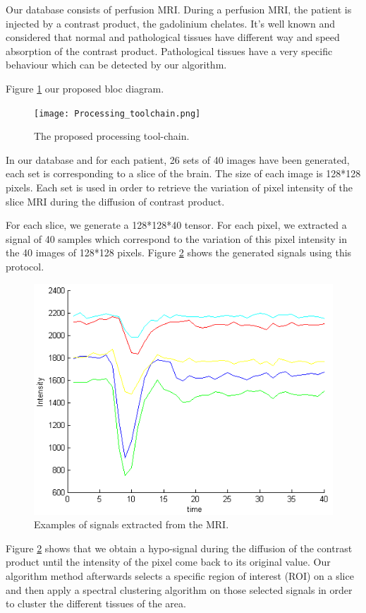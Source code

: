 Our database consists of perfusion MRI. During a perfusion MRI, the patient is injected by a contrast product, the gadolinium chelates. It's well known and considered that normal and pathological tissues have different way and speed absorption of the contrast product. Pathological tissues have a very specific behaviour which can be detected by our algorithm.

Figure \ref{fig:Processing_toolchain} our proposed bloc diagram.

\begin{figure}[h]
\centering
    \texttt{[image: Processing\_toolchain.png]}
    \caption{The proposed processing tool-chain.}
    \label{fig:Processing_toolchain}
\end{figure}



In our database and for each patient, 26 sets of 40 images have been generated, each set is corresponding to a slice of the brain. The size of each image is 128*128 pixels. Each set is used in order to retrieve the variation of pixel intensity of the slice MRI during the diffusion of contrast product.

For each slice, we generate a 128*128*40 tensor. For each pixel, we extracted a signal of 40 samples which correspond to the variation of this pixel intensity in the 40 images of 128*128 pixels. Figure \ref{fig:CourbeExample} shows the generated signals using this protocol.

\begin{figure}
\centering
    \includegraphics[scale=0.5,angle=0]{CourbeExample.png}
    \caption{Examples of signals extracted from the MRI.}
    \label{fig:CourbeExample}
\end{figure}

Figure \ref{fig:CourbeExample} shows that we obtain a hypo-signal during the diffusion of the contrast product until the intensity of the pixel come back to its original value. Our algorithm method afterwards selects a specific region of interest (ROI) on a slice and then apply a spectral clustering algorithm on those selected signals in order to cluster the different tissues of the area.




